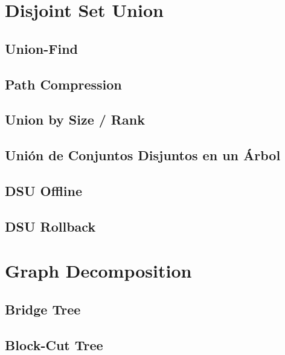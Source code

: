 \documentclass[10pt,a4paper,twocolumn]{article}
\begin{document}

\section{Disjoint Set Union}

\subsection{Union-Find}

\subsection{Path Compression}

\subsection{Union by Size / Rank}

\subsection{Unión de Conjuntos Disjuntos en un Árbol}

\subsection{DSU Offline}

\subsection{DSU Rollback}



\section{Graph Decomposition}

\subsection{Bridge Tree}

\subsection{Block-Cut Tree}
\end{document}
